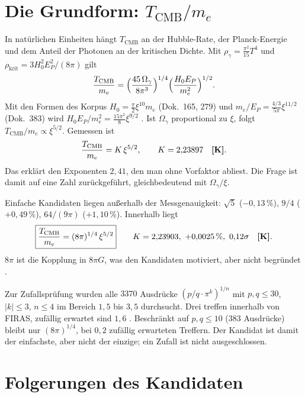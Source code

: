 \section{Die Grundform: $T_{\mathrm{CMB}}/m_e$}

In natürlichen Einheiten hängt $T_{\mathrm{CMB}}$ an der Hubble-Rate, der Planck-Energie und dem
Anteil der Photonen an der kritischen Dichte. Mit $\rho_\gamma=\frac{\pi^2}{15}T^4$ und
$\rho_{\mathrm{krit}}=3H_0^2E_P^2/(8\pi)$ gilt
\begin{equation}
\frac{T_{\mathrm{CMB}}}{m_e}=\Bigl(\frac{45\,\Omega_\gamma}{8\pi^3}\Bigr)^{1/4}
\Bigl(\frac{H_0E_P}{m_e^2}\Bigr)^{1/2}.
\end{equation}
Mit den Formen des Korpus $H_0=\frac{\pi}{2}\xi^{10}m_e$ (Dok.~165, 279) und
$m_e/E_P=\frac{4/3}{5\pi}\xi^{11/2}$ (Dok.~383) wird $H_0E_P/m_e^2=\frac{15\pi^2}{8}\xi^{9/2}$
\BM. Ist $\Omega_\gamma$ proportional zu $\xi$, folgt $T_{\mathrm{CMB}}/m_e\propto\xi^{5/2}$.
Gemessen ist
\begin{equation}
\frac{T_{\mathrm{CMB}}}{m_e}=K\,\xi^{5/2},\qquad K=2{,}23897 \quad\textbf{[K]}.
\end{equation}
Das erklärt den Exponenten $2{,}41$, den man ohne Vorfaktor abliest. Die Frage ist damit auf eine
Zahl zurückgeführt, gleichbedeutend mit $\Omega_\gamma/\xi$.

Einfache Kandidaten liegen außerhalb der Messgenauigkeit: $\sqrt5$ ($-0{,}13\,\%$), $9/4$
($+0{,}49\,\%$), $64/(9\pi)$ ($+1{,}10\,\%$). Innerhalb liegt
\begin{equation}
\boxed{\frac{T_{\mathrm{CMB}}}{m_e}=(8\pi)^{1/4}\,\xi^{5/2}}
\qquad K=2{,}23903,\ +0{,}0025\,\%,\ 0{,}12\sigma \quad\textbf{[K]}.
\end{equation}
$8\pi$ ist die Kopplung in $8\pi G$, was den Kandidaten motiviert, aber nicht begründet \SM.

Zur Zufallsprüfung wurden alle $3370$ Ausdrücke $(p/q\cdot\pi^k)^{1/n}$ mit $p,q\le30$,
$|k|\le3$, $n\le4$ im Bereich $1{,}5$ bis $3{,}5$ durchsucht. Drei treffen innerhalb von FIRAS,
zufällig erwartet sind $1{,}6$ \KM. Beschränkt auf $p,q\le10$ (383 Ausdrücke) bleibt nur
$(8\pi)^{1/4}$, bei $0{,}2$ zufällig erwarteten Treffern. Der Kandidat ist damit der einfachste,
aber nicht der einzige; ein Zufall ist nicht ausgeschlossen.

\section{Folgerungen des Kandidaten}

